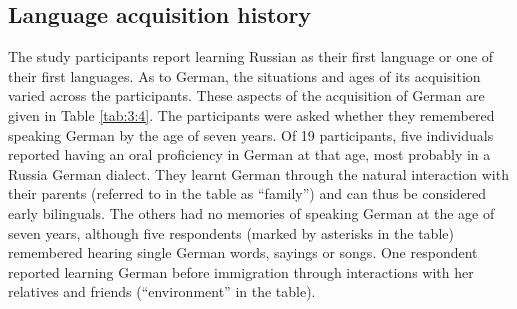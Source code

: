\subsection{Language acquisition history}
The study participants report learning Russian as their first language or one of their first languages. As to German, the situations and ages of its acquisition varied across the participants. These aspects of the acquisition of German are given in Table \ref{tab:3:4}. The participants were asked whether they remembered speaking German by the age of seven years. Of 19 participants, five individuals reported having an oral proficiency in German at that age, most probably in a Russia German dialect. They learnt German through the natural interaction with their parents (referred to in the table as 
“family”) and can thus be considered early bilinguals. The others had no memories of speaking German at the age of seven years, although five respondents (marked by asterisks in the table) remembered hearing single German words, sayings or songs. One respondent reported learning German before immigration through interactions with her relatives and friends (“environment” in the table).


